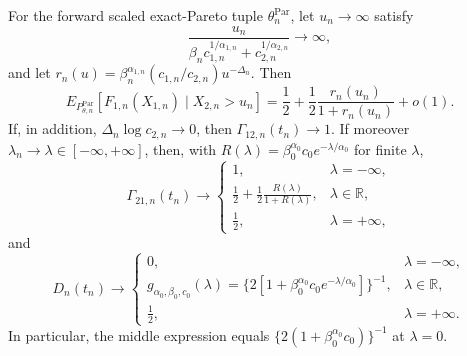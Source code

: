 For the forward scaled exact-Pareto tuple \(\theta_n^{\mathrm{Par}}\), let \(u_n\to\infty\) satisfy
\[
\frac{u_n}{\beta_n c_{1,n}^{1/\alpha_{1,n}}+c_{2,n}^{1/\alpha_{2,n}}}\to\infty,
\]
and let \(r_n(u)=\beta_n^{\alpha_{1,n}}(c_{1,n}/c_{2,n})u^{-\Delta_n}\). Then
\[
E_{P_{\theta,n}^{\mathrm{Par}}}[F_{1,n}(X_{1,n})\mid X_{2,n}>u_n]
=\frac12+\frac12\frac{r_n(u_n)}{1+r_n(u_n)}+o(1).
\]
If, in addition, \(\Delta_n\log c_{2,n}\to0\), then \(\Gamma_{12,n}(t_n)\to1\). If moreover \(\lambda_n\to\lambda\in[-\infty,+\infty]\), then, with \(R(\lambda)=\beta_0^{\alpha_0}c_0e^{-\lambda/\alpha_0}\) for finite \(\lambda\),
\[
\Gamma_{21,n}(t_n)\longrightarrow
\begin{cases}
1, & \lambda=-\infty,\\
\displaystyle \frac12+\frac12\frac{R(\lambda)}{1+R(\lambda)}, & \lambda\in\mathbb R,\\
\frac12, & \lambda=+\infty,
\end{cases}
\]
and
\[
D_n(t_n)\longrightarrow
\begin{cases}
0, & \lambda=-\infty,\\
g_{\alpha_0,\beta_0,c_0}(\lambda)
=\{2[1+\beta_0^{\alpha_0}c_0e^{-\lambda/\alpha_0}]\}^{-1}, & \lambda\in\mathbb R,\\
\frac12, & \lambda=+\infty.
\end{cases}
\]
In particular, the middle expression equals \(\{2(1+\beta_0^{\alpha_0}c_0)\}^{-1}\) at \(\lambda=0\).